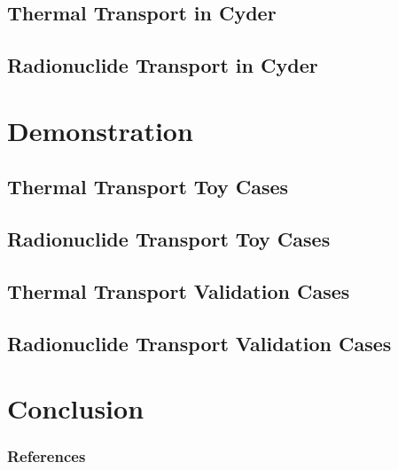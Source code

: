 \documentclass[9pt]{beamer}
\begin{document}
%
\subsection{Thermal Transport in Cyder}

\subsection{Radionuclide Transport in Cyder}


\section{Demonstration}

\subsection{Thermal Transport Toy Cases}

\subsection{Radionuclide Transport Toy Cases}

\subsection{Thermal Transport Validation Cases}

\subsection{Radionuclide Transport Validation Cases}


\section{Conclusion}


\begin{frame}[allowframebreaks]
  \frametitle{References}
  
  {\footnotesize  }

\end{frame}




\end{document}

